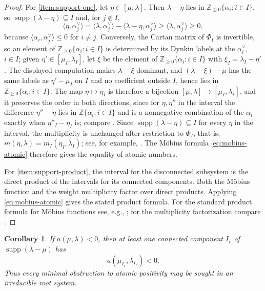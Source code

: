 \documentclass[11pt]{article}
\newtheorem{corollary}[corollary]{Corollary}
\theoremstyle{definition}
\theoremstyle{remark}
\newcommand{\Raiz}{\Phi}
\newcommand{\supp}{\operatorname{supp}}
\newcommand{\Z}{\mathbb Z}
\begin{document}
\begin{proof}
For \cref{item:support-one}, let $\eta\in[\mu,\lambda]$.  Then
$\lambda-\eta$ lies in $\Z_{\ge0}\{\alpha_i:i\in I\}$, so
$\supp(\lambda-\eta)\subseteq I$ and, for $j\notin I$,
\[
 \langle\eta,\alpha_j^\vee\rangle
   =\langle\lambda,\alpha_j^\vee\rangle
      -\langle\lambda-\eta,\alpha_j^\vee\rangle
   \ge\langle\lambda,\alpha_j^\vee\rangle\ge0,
\]
because $\langle\alpha_i,\alpha_j^\vee\rangle\le0$ for $i\ne j$.  Conversely,
the Cartan matrix of $\Raiz_I$ is invertible, so an element of
$\Z_{\ge0}\{\alpha_i:i\in I\}$ is determined by its Dynkin labels at the
$\alpha_i^\vee$, $i\in I$; given $\eta'\in[\mu_I,\lambda_I]$, let $\xi$ be the
element of $\Z_{\ge0}\{\alpha_i:i\in I\}$ with $\xi_I=\lambda_I-\eta'$.  The
displayed computation makes $\lambda-\xi$ dominant, and
$(\lambda-\xi)-\mu$ has the same labels as $\eta'-\mu_I$ on $I$ and no
coefficient outside $I$, hence lies in $\Z_{\ge0}\{\alpha_i:i\in I\}$.  The
map $\eta\mapsto\eta_I$ is therefore a bijection
$[\mu,\lambda]\to[\mu_I,\lambda_I]$, and it preserves the order in both
directions, since for $\eta,\eta''$ in the interval the difference
$\eta''-\eta$ lies in $\Z\{\alpha_i:i\in I\}$ and is a nonnegative
combination of the $\alpha_i$ exactly when $\eta''_I-\eta_I$ is; compare
\cite[Lemma~3.1]{Stembridge}.  Since $\supp(\lambda-\eta)\subseteq I$ for
every $\eta$ in the interval, the multiplicity is unchanged after restriction
to $\Raiz_I$, that is, $m(\eta,\lambda)=m_I(\eta_I,\lambda_I)$; see, for
example, \cite[Proposition~2.4(1)]{BZ1}.  The M\"obius formula
\eqref{eq:mobius-atomic} therefore gives the equality of atomic numbers.

For \cref{item:support-product}, the interval for the disconnected subsystem
is the direct product of the intervals for its connected components.  Both the
M\"obius function and the weight multiplicity factor over direct products.
Applying \eqref{eq:mobius-atomic} gives the stated product formula.  For the
standard product formula for M\"obius functions see, e.g.,
\cite[Section~3.8]{StanleyEC1}; for
the multiplicity factorization compare \cite[Proposition~2.4(2)]{BZ1}.
\end{proof}

\begin{corollary}\label{cor:minimal-obstruction-connected}
If $a(\mu,\lambda)<0$, then at least one connected component $I_r$ of
$\supp(\lambda-\mu)$ has
\[
    a(\mu_{I_r},\lambda_{I_r})<0.
\]
Thus every minimal obstruction to atomic positivity may be sought in an
irreducible root system.
\end{corollary}
\end{document}
